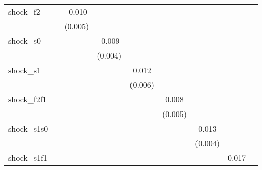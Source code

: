 {\begin{tabular}{l*{8}{c}}
\addlinespace
shock\_f2    &                     &      -0.010\sym{**} &                     &                     &                     &                     &                     &                     \\
            &                     &     (0.005)         &                     &                     &                     &                     &                     &                     \\
\addlinespace
shock\_s0    &                     &                     &      -0.009\sym{**} &                     &                     &                     &                     &                     \\
            &                     &                     &     (0.004)         &                     &                     &                     &                     &                     \\
\addlinespace
shock\_s1    &                     &                     &                     &       0.012\sym{*}  &                     &                     &                     &                     \\
            &                     &                     &                     &     (0.006)         &                     &                     &                     &                     \\
\addlinespace
shock\_f2f1  &                     &                     &                     &                     &       0.008         &                     &                     &                     \\
            &                     &                     &                     &                     &     (0.005)         &                     &                     &                     \\
\addlinespace
shock\_s1s0  &                     &                     &                     &                     &                     &       0.013\sym{***}&                     &                     \\
            &                     &                     &                     &                     &                     &     (0.004)         &                     &                     \\
\addlinespace
shock\_s1f1  &                     &                     &                     &                     &                     &                     &       0.017\sym{*}  &                     \\

\end{tabular}}
